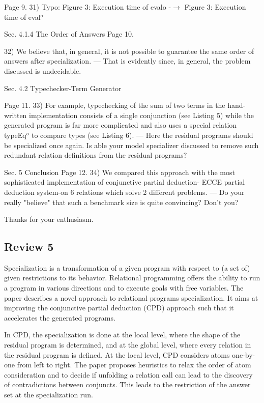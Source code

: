 Page 9.
31) Typo:
  Figure 3: Execution time of evalo -$\to$ Figure 3: Execution time of eval$^o$

Sec. 4.1.4 The Order of Answers
Page 10.

32) We believe that, in general, it is not possible to guarantee the same order of answers after specialization.
 --- That is evidently since, in general, the problem discussed is undecidable.

Sec. 4.2 Typechecker-Term Generator

Page 11.
33) For example, typechecking of the sum of two terms in the hand-written implementation consists of a single conjunction (see Listing 5) while the generated program is far more complicated and also uses a special relation typeEq$^o$ to compare types (see Listing 6).
 --- Here the residual programs should be specialized once again. Is able your model specializer discussed to remove such redundant relation definitions from the residual programs?

Sec. 5 Conclusion
Page 12.
34) We compared this approach with the most sophisticated implementation of conjunctive partial deduction- ECCE partial deduction system-on 6 relations which solve 2 different problems.
 --- Do your really "believe" that such a benchmark size is quite convincing? Don't you?

Thanks for your enthusiasm.

\subsection*{Review 5}

Specialization is a transformation of a given program with respect to (a set of) given restrictions to its behavior. Relational programming offers the ability to run a program in various directions and to execute goals with free variables. The paper describes a novel approach to relational programs specialization. It aims at improving the conjunctive partial deduction (CPD) approach such that it accelerates the generated programs.

In CPD, the specialization is done at the local level, where the shape of the residual program is determined, and at the global level, where every relation in the residual program is defined. At the local level, CPD considers atoms one-by-one from left to right. The paper proposes heuristics to relax the order of atom consideration and to decide if unfolding a relation call can lead to the discovery of contradictions between conjuncts. This leads to the restriction of the answer set at the specialization run.

